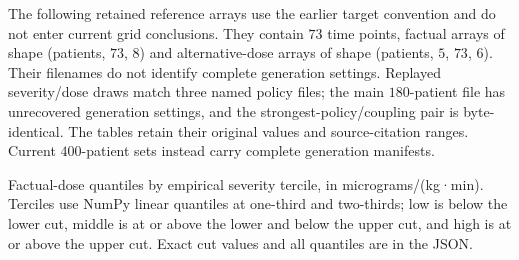 The following retained reference arrays use the earlier target convention and do not enter current grid conclusions. They contain $73$ time points, factual arrays of shape (patients, $73$, $8$) and alternative-dose arrays of shape (patients, $5$, $73$, $6$). Their filenames do not identify complete generation settings. Replayed severity/dose draws match three named policy files; the main $180$-patient file has unrecovered generation settings, and the strongest-policy/coupling pair is byte-identical. The tables retain their original values and source-citation ranges. Current $400$-patient sets instead carry complete generation manifests.

Factual-dose quantiles by empirical severity tercile, in micrograms/(kg·min). Terciles use NumPy linear quantiles at one-third and two-thirds; low is below the lower cut, middle is at or above the lower and below the upper cut, and high is at or above the upper cut. Exact cut values and all quantiles are in the JSON.


